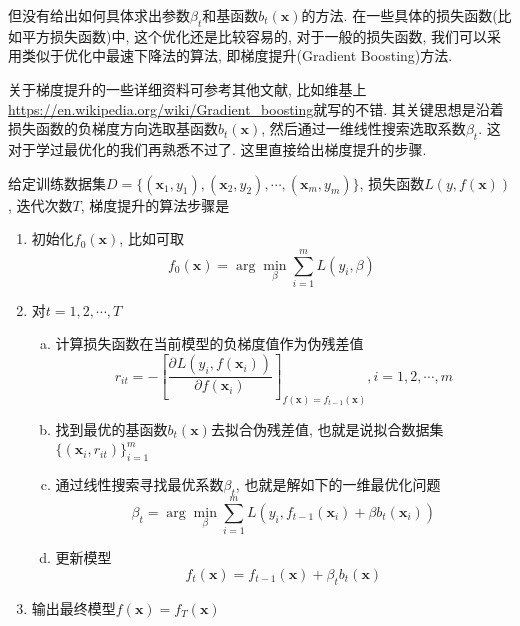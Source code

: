 \documentclass[a4paper,UTF8]{ctexart}
\theoremstyle{plain} \newtheorem{theorem}{定理}[section]
\theoremstyle{plain} \newtheorem{definition}{定义}[section]
\theoremstyle{plain} \newtheorem{lemma}{引理}[section]
\theoremstyle{plain} \newtheorem{proposition}{命题}[section]
\theoremstyle{plain} \newtheorem{example}{例}[section]
\theoremstyle{plain} \newtheorem{remark}{注}[section]
\theoremstyle{plain} \newtheorem{corollary}{推论}[section]
\newcommand{\p}[3]{\frac{\partial^{#1}#2}{\partial{#3}^{#1}}}  %
\begin{document}
但没有给出如何具体求出参数$\beta_{t}$和基函数$b_{t}(\bm{x})$的方法. 在一些具体的损失函数(比如平方损失函数)中, 这个优化还是比较容易的, 对于一般的损失函数, 我们可以采用类似于优化中最速下降法的算法, 即梯度提升(Gradient Boosting)方法.

关于梯度提升的一些详细资料可参考其他文献, 比如维基上\url{https://en.wikipedia.org/wiki/Gradient_boosting}就写的不错. 其关键思想是沿着损失函数的负梯度方向选取基函数$b_{t}(\bm{x})$, 然后通过一维线性搜索选取系数$\beta_{t}$. 这对于学过最优化的我们再熟悉不过了. 这里直接给出梯度提升的步骤.

给定训练数据集$D = \{(\bm{x}_1, y_1), (\bm{x}_2, y_2), \cdots, (\bm{x}_{m}, y_m)\}$, 损失函数$L(y, f(\bm{x}))$, 迭代次数$T$, 梯度提升的算法步骤是
\begin{enumerate}[(1)]
\item 初始化$f_{0}(\bm{x})$, 比如可取
\begin{equation*}
f_{0}(\bm{x}) = \arg \min_{\beta} \sum_{i=1}^{m} L(y_i, \beta)
\end{equation*}

\item 对$t = 1, 2, \cdots, T$
\begin{enumerate}[(a)]
\item 计算损失函数在当前模型的负梯度值作为伪残差值
\begin{equation*}
r_{it} = - \left[ \p{}{L(y_i, f(\bm{x}_i))}{f(\bm{x}_i)} \right]_{f(\bm{x}) = f_{t-1}(\bm{x})} , i = 1, 2, \cdots, m
\end{equation*}

\item 找到最优的基函数$b_{t}(\bm{x})$去拟合伪残差值, 也就是说拟合数据集$\{(\bm{x}_i, r_{it})\}_{i=1}^{m}$

\item 通过线性搜索寻找最优系数$\beta_{t}$, 也就是解如下的一维最优化问题
\begin{equation*}
\beta_{t} = \arg \min_{\beta} \sum_{i=1}^{m} L(y_i, f_{t-1}(\bm{x}_i) + \beta b_{t}(\bm{x}_i))
\end{equation*}

\item 更新模型
\begin{equation*}
f_{t}(\bm{x}) = f_{t-1}(\bm{x}) + \beta_{t} b_{t}(\bm{x})
\end{equation*}

\end{enumerate}

\item 输出最终模型$f(\bm{x}) = f_{T}(\bm{x})$

\end{enumerate}
\end{document}
